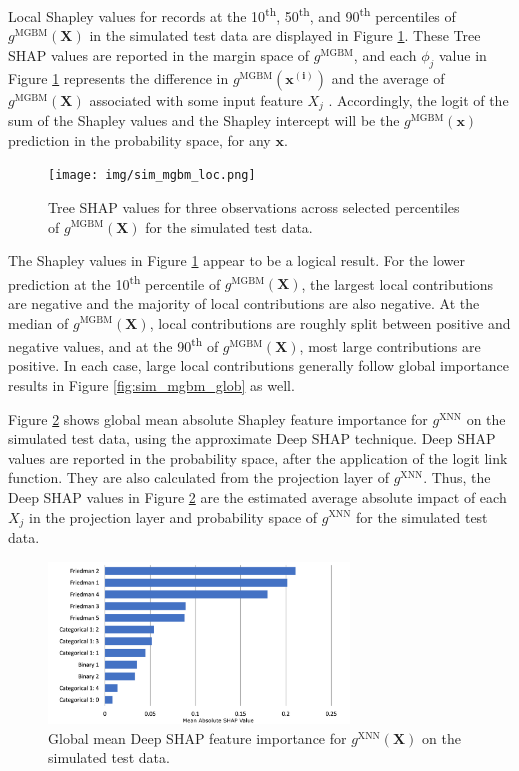 \documentclass[information,article,submit,moreauthors,pdftex]{definitions/mdpi}
\begin{document}
Local Shapley values for records at the 10\textsuperscript{th}, 50\textsuperscript{th}, and 90\textsuperscript{th} percentiles of $g^\text{MGBM}(\mathbf{X})$ in the simulated test data are displayed in Figure \ref{fig:sim_mgbm_loc}. These Tree SHAP values are reported in the margin space of $g^\text{MGBM}$, and each $\phi_j$ value in Figure \ref{fig:sim_mgbm_loc} represents the difference in $g^\text{MGBM}(\mathbf{x^{(i)}})$ and the average of $g^\text{MGBM}(\mathbf{X})$ associated with some input feature $X_j$ \cite{molnar}. Accordingly, the logit of the sum of the Shapley values and the Shapley intercept will be the $g^\text{MGBM}(\mathbf{x})$ prediction in the probability space, for any $\mathbf{x}$. 

\begin{figure}[H]
\centering
\texttt{[image: img/sim\_mgbm\_loc.png]}
\caption{Tree SHAP values for three observations across selected percentiles of $g^\text{MGBM}(\mathbf{X})$ for the simulated test data.}
\label{fig:sim_mgbm_loc}
\end{figure}   

\noindent The Shapley values in Figure \ref{fig:sim_mgbm_loc} appear to be a logical result. For the lower prediction at the 10\textsuperscript{th} percentile of $g^\text{MGBM}(\mathbf{X})$, the largest local contributions are negative and the majority of local contributions are also negative. At the median of $g^\text{MGBM}(\mathbf{X})$, local contributions are roughly split between positive and negative values, and at the 90\textsuperscript{th} of $g^\text{MGBM}(\mathbf{X})$, most large contributions are positive. In each case, large local contributions generally follow global importance results in Figure \ref{fig:sim_mgbm_glob} as well.

Figure \ref{fig:sim_xnn_glob} shows global mean absolute Shapley feature importance for $g^\text{XNN}$ on the simulated test data, using the approximate Deep SHAP technique. Deep SHAP values are reported in the probability space, after the application of the logit link function. They are also calculated from the projection layer of $g^\text{XNN}$. Thus, the Deep SHAP values in Figure \ref{fig:sim_xnn_glob} are the estimated average absolute impact of each $X_j$ in the projection layer and probability space of $g^\text{XNN}$ for the simulated test data. 

\begin{figure}[H]
\centering
\includegraphics[width=8cm]{img/sim_xnn_glob.png}
\caption{Global mean Deep SHAP feature importance for $g^\text{XNN}(\mathbf{X})$ on the simulated test data.}
\label{fig:sim_xnn_glob}
\end{figure} 
\end{document}

